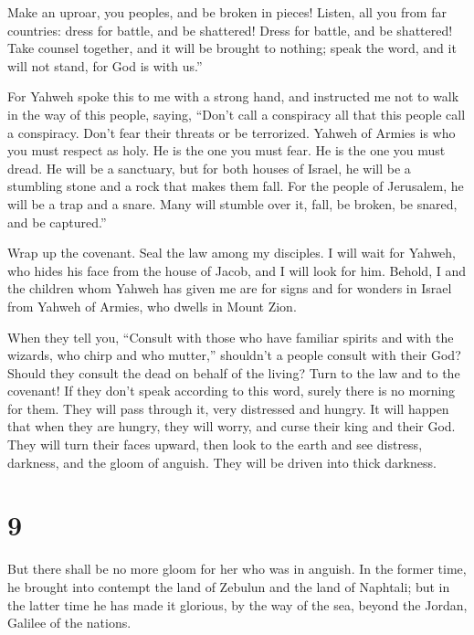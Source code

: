  Make an uproar, you peoples, and be broken in pieces!
Listen, all you from far countries: dress for battle, and be shattered!
Dress for battle, and be shattered!  Take counsel
together, and it will be brought to nothing; speak the word, and it will
not stand, for God is with us.''

 For Yahweh spoke this to me with a strong hand, and
instructed me not to walk in the way of this people, saying,
 ``Don't call a conspiracy all that this people call a
conspiracy. Don't fear their threats or be terrorized. 
Yahweh of Armies is who you must respect as holy. He is the one you must
fear. He is the one you must dread.  He will be a
sanctuary, but for both houses of Israel, he will be a stumbling stone
and a rock that makes them fall. For the people of Jerusalem, he will be
a trap and a snare.  Many will stumble over it, fall, be
broken, be snared, and be captured.''

 Wrap up the covenant. Seal the law among my disciples.
 I will wait for Yahweh, who hides his face from the
house of Jacob, and I will look for him.  Behold, I and
the children whom Yahweh has given me are for signs and for wonders in
Israel from Yahweh of Armies, who dwells in Mount Zion.

 When they tell you, ``Consult with those who have
familiar spirits and with the wizards, who chirp and who mutter,''
shouldn't a people consult with their God? Should they consult the dead
on behalf of the living?  Turn to the law and to the
covenant! If they don't speak according to this word, surely there is no
morning for them.  They will pass through it, very
distressed and hungry. It will happen that when they are hungry, they
will worry, and curse their king and their God. They will turn their
faces upward,  then look to the earth and see distress,
darkness, and the gloom of anguish. They will be driven into thick
darkness.

\hypertarget{section-8}{%
\section{9}\label{section-8}}

 But there shall be no more gloom for her who was in
anguish. In the former time, he brought into contempt the land of
Zebulun and the land of Naphtali; but in the latter time he has made it
glorious, by the way of the sea, beyond the Jordan, Galilee of the
nations.

